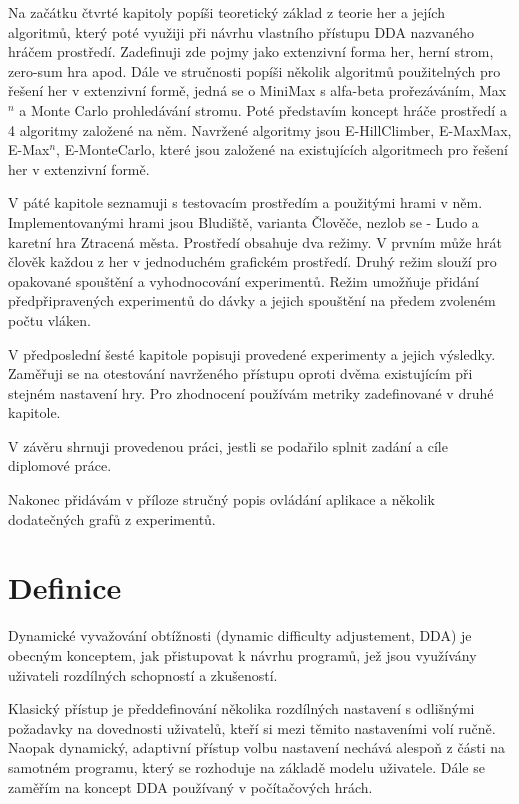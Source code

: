 Na začátku čtvrté kapitoly  popíši teoretický základ z teorie her a jejích algoritmů, který poté využiji při návrhu vlastního přístupu DDA nazvaného hráčem prostředí. Zadefinuji zde pojmy jako extenzivní forma her, herní strom, zero-sum hra apod. Dále ve stručnosti popíši několik algoritmů použitelných pro řešení her v extenzivní formě, jedná se o MiniMax s alfa-beta prořezáváním, Max$^n$ a Monte Carlo prohledávání stromu.
Poté představím koncept hráče prostředí a 4 algoritmy založené na něm. Navržené algoritmy jsou E-HillClimber, E-MaxMax, E-Max$^n$, E-MonteCarlo, které jsou založené na existujících algoritmech pro řešení her v extenzivní formě.

V páté kapitole seznamuji s testovacím prostředím a použitými hrami v něm. Implementovanými hrami jsou Bludiště, varianta Člověče, nezlob se - Ludo a karetní hra Ztracená města. Prostředí obsahuje dva režimy. V prvním může hrát člověk každou z her v jednoduchém grafickém prostředí. Druhý režim slouží pro opakované spouštění a vyhodnocování experimentů. Režim umožňuje přidání předpřipravených experimentů do dávky a jejich spouštění na předem zvoleném počtu vláken.

V předposlední šesté kapitole popisuji provedené experimenty a jejich výsledky. Zaměřuji se na otestování navrženého přístupu oproti dvěma existujícím při stejném nastavení hry. Pro zhodnocení používám metriky zadefinované v druhé kapitole.

V závěru shrnuji provedenou práci, jestli se podařilo splnit zadání a cíle diplomové práce.

Nakonec přidávám v příloze stručný popis ovládání aplikace a několik dodatečných grafů z experimentů.

\section{Definice}

Dynamické vyvažování obtížnosti (dynamic difficulty adjustement, DDA) je obecným konceptem, jak přistupovat k návrhu programů, jež jsou využívány uživateli rozdílných schopností a zkušeností. 

Klasický přístup je předdefinování několika rozdílných nastavení s odlišnými požadavky na dovednosti uživatelů, kteří si mezi těmito nastaveními volí ručně. Naopak dynamický, adaptivní přístup volbu nastavení nechává alespoň z části na samotném programu, který se rozhoduje na základě modelu uživatele. Dále se zaměřím na koncept DDA používaný v počítačových hrách.


